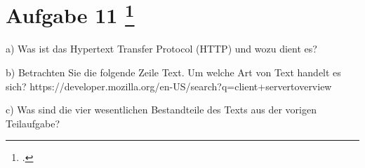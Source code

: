 \documentclass{lehramt-informatik-aufgabe}
\begin{document}
\section{Aufgabe 11
\footcite{66116:2021:03}}

a) Was ist das Hypertext Transfer Protocol (HTTP) und wozu dient es?

b) Betrachten Sie die folgende Zeile Text. Um welche Art von Text handelt es sich?
https://developer.mozilla.org/en-US/search?q=client+servertoverview

c) Was sind die vier wesentlichen Bestandteile des Texts aus der vorigen Teilaufgabe?
\end{document}
